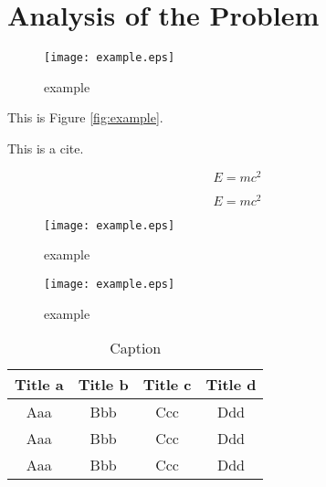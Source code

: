 \section{Analysis of the Problem}  %

\begin{figure}[h]  %
\small
\centering  %
\texttt{[image: example.eps]}  %
\caption{example} \label{fig:example}  %
\end{figure}  %

This is Figure \eqref{fig:example}.  %

This is a cite\cite{vaswani2017attention}.  %

\begin{equation}  %
E = mc^2 \label{aa}  %
\end{equation}  %

\begin{equation}  %
\nonumber %
E = mc^2
\end{equation}  %

\begin{figure}[h]  %
\centering  %
\begin{minipage}[c]{0.48\textwidth}  %
\centering  %
\texttt{[image: example.eps]}  %
\caption{example} \label{fig:example}  %
\end{minipage}  %
\hspace{0.02\textwidth}
\begin{minipage}[c]{0.48\textwidth}  %
\centering  %
\texttt{[image: example.eps]}  %
\caption{example} \label{fig:example}  %
\end{minipage}  %
\end{figure}  %

\begin{table}[!t]  %
\caption{Caption}  %
\label{tab1}  %
\tabcolsep 42pt %
\begin{tabular*}{\textwidth}{cccc}  %
\toprule  %
Title a & Title b & Title c & Title d \\
\midrule  %
Aaa & Bbb & Ccc & Ddd \\
Aaa & Bbb & Ccc & Ddd \\
Aaa & Bbb & Ccc & Ddd \\
\bottomrule  %
\end{tabular*}  %
\end{table}  %


